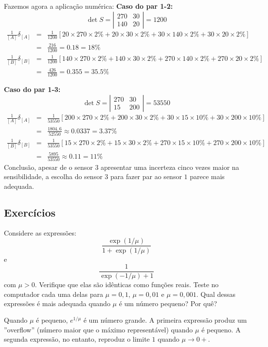 \begin{resol}
Fazemos agora a aplicação numérica:
{\bf Caso do par 1-2:}
$$\det{S}=\left|\begin{matrix}270&30\\140&20\end{matrix}\right|=1200$$
\begin{eqnarray*}
\frac{1}{[A]}\delta_{[A]}
&=&\frac{1}{1200}\left[20\times 270\times 2\%+20\times 30\times 2\%+30\times 140\times 2\%+30\times 20\times 2\%\right]\\&=&\frac{216}{1200}=0.18=18\%\\
\frac{1}{[B]}\delta_{[B]}
&=&\frac{1}{1200}\left[140\times 270\times 2\%+140\times 30\times 2\%+270\times 140\times 2\%+270\times 20\times 2\%\right]\\&=&\frac{426}{1200}=0.355=35.5\%
\end{eqnarray*}

{\bf Caso do par 1-3:}
$$\det{S}=\left|\begin{array}{cc}270&30\\15&200\end{array}\right|=53550$$
\begin{eqnarray*}
\frac{1}{[A]}\delta_{[A]}
&=&\frac{1}{53550}\left[200\times 270\times 2\%+200\times 30\times 2\%+30\times 15\times 10\%+30\times 200\times 10\%\right]\\&=&\frac{1804,6}{52550}\approx 0.0337=3.37\%\\
\frac{1}{[B]}\delta_{[B]}
&=&\frac{1}{53550}\left[15\times 270\times 2\%+15\times 30\times 2\%+270\times 15\times 10\%+270\times 200\times 10\%\right]\\&=&	\frac{5895}{53550}\approx   0.11=11\%
\end{eqnarray*}
Conclusão, apesar de o sensor $3$ apresentar uma incerteza cinco vezes maior na sensibilidade, a escolha do sensor $3$ para fazer par ao sensor $1$ parece mais adequada.
\end{resol}


\subsection*{Exercícios}

\begin{exer} Considere as expressões:
  \begin{equation*}
    \frac{\exp(1/\mu)}{1+\exp(1/\mu)}
  \end{equation*}
e
\begin{equation*}
  \frac{1}{\exp(-1/\mu)+1}
\end{equation*}
com $\mu>0$. Verifique que elas são idênticas como funções reais. Teste no computador cada uma delas para $\mu=0,1$, $\mu=0,01$ e $\mu=0,001$. Qual dessas expressões é mais adequada quando $\mu$ é um número pequeno? Por quê?
\end{exer}
\begin{resp}
  Quando $\mu$ é pequeno, $e^{1/\mu}$ é um número grande. A primeira expressão produz um ''overflow'' (número maior que o máximo representável) quando $\mu$ é pequeno. A segunda expressão, no entanto, reproduz o limite $1$ quando $\mu\to 0+$.
\end{resp}

